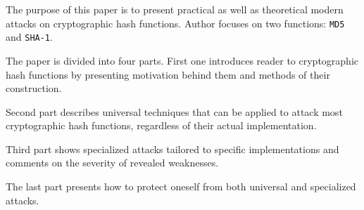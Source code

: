 The purpose of this paper is to present practical as well as theoretical modern
attacks on cryptographic hash functions. Author focuses on two functions:
\texttt{MD5} and \texttt{SHA-1}.

The paper is divided into four parts. First one introduces reader to
cryptographic hash functions by presenting motivation behind them and  methods
of their construction.

Second part describes universal techniques that can be applied to attack most
cryptographic hash functions, regardless of their actual implementation.

Third part shows specialized attacks tailored to specific implementations and
comments on the severity of revealed weaknesses.

The last part presents how to protect oneself from both universal and
specialized attacks.
